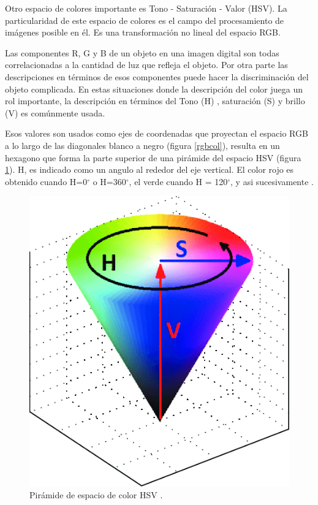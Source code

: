 \documentclass[twoside,spanish,ESP,MSc]{plantillaLabUPV}
\theoremstyle{definition}
\begin{document}
Otro espacio de colores importante es Tono - Saturación - Valor (HSV). La particularidad de este espacio de colores es el campo del procesamiento de imágenes posible en él. Es una transformación no lineal del espacio RGB.

Las componentes R, G y B de un objeto en una imagen digital son todas correlacionadas a la cantidad de luz que refleja el objeto. Por otra parte las descripciones en términos de esos componentes puede hacer la discriminación del objeto complicada. En estas situaciones donde la descripción del color juega un rol importante, la descripción en términos del Tono (H) , saturación (S) y brillo (V) es comúnmente usada.

Esos valores son usados como ejes de coordenadas que proyectan el espacio RGB a lo largo de las diagonales blanco a negro (figura \ref{rgbcol}), resulta en un hexagono que forma la parte superior de una pirámide del espacio HSV (figura \ref{hsvcol}). H, es indicado como un angulo al rededor del eje vertical. El color rojo es obtenido cuando H=0$^{\circ}$ o H=360$^{\circ}$, el verde cuando H = 120$^{\circ}$, y asi sucesivamente \cite{Koschan:2008:DCI:1370941}.

\begin{figure}[!tbh] 
	\centering 
		\includegraphics[scale=.35]{ima/hsvcol} 
	\caption{Pirámide de espacio de color HSV \cite{hsvspace}.} 
	\label{hsvcol} 
\end{figure}
\end{document}
